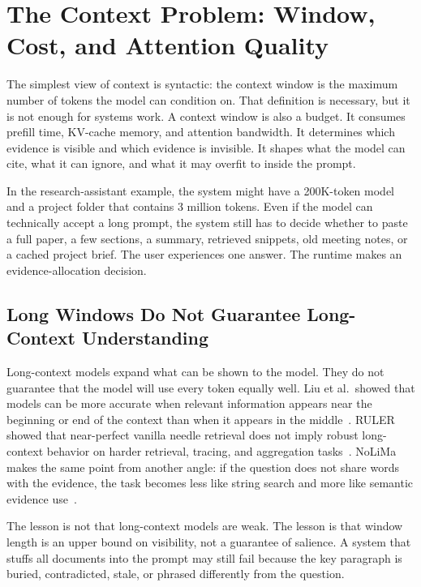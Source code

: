 \section{The Context Problem: Window, Cost, and Attention Quality}
\label{sec:ch20-context-problem}

The simplest view of context is syntactic: the context window is the maximum number of tokens the model can condition on. That definition is necessary, but it is not enough for systems work. A context window is also a budget. It consumes prefill time, KV-cache memory, and attention bandwidth. It determines which evidence is visible and which evidence is invisible. It shapes what the model can cite, what it can ignore, and what it may overfit to inside the prompt.

In the research-assistant example, the system might have a 200K-token model and a project folder that contains 3 million tokens. Even if the model can technically accept a long prompt, the system still has to decide whether to paste a full paper, a few sections, a summary, retrieved snippets, old meeting notes, or a cached project brief. The user experiences one answer. The runtime makes an evidence-allocation decision.

\subsection{Long Windows Do Not Guarantee Long-Context Understanding}

Long-context models expand what can be shown to the model. They do not guarantee that the model will use every token equally well. Liu et al.\ showed that models can be more accurate when relevant information appears near the beginning or end of the context than when it appears in the middle~\cite{liu2023lost}. RULER showed that near-perfect vanilla needle retrieval does not imply robust long-context behavior on harder retrieval, tracing, and aggregation tasks~\cite{hsieh2024ruler}. NoLiMa makes the same point from another angle: if the question does not share words with the evidence, the task becomes less like string search and more like semantic evidence use~\cite{modarressi2025nolima}.

The lesson is not that long-context models are weak. The lesson is that window length is an upper bound on visibility, not a guarantee of salience. A system that stuffs all documents into the prompt may still fail because the key paragraph is buried, contradicted, stale, or phrased differently from the question.

